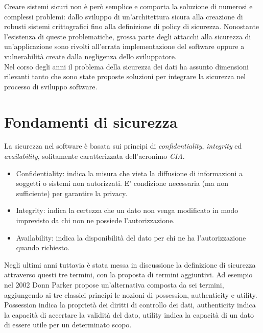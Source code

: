 Creare sistemi sicuri non è però semplice e comporta la soluzione di numerosi e complessi problemi: dallo sviluppo di un'architettura sicura alla creazione di robusti sistemi crittografici fino alla definizione di policy di sicurezza. Nonostante l'esistenza di queste problematiche, grossa parte degli attacchi alla sicurezza di un'applicazione sono rivolti all'errata implementazione del software oppure a vulnerabilità create dalla negligenza dello sviluppatore.\\
Nel corso degli anni il problema della sicurezza dei dati ha assunto dimensioni rilevanti tanto che sono state proposte soluzioni per integrare la sicurezza nel processo di sviluppo software.

\section{Fondamenti di sicurezza}
La sicurezza nel software è basata sui principi di \emph{confidentiality}, \emph{integrity} ed \emph{availability}, solitamente caratterizzata dell'acronimo \emph{CIA}.\\
\begin{itemize}
\item Confidentiality: indica la misura che vieta la diffusione di informazioni a soggetti o sistemi non autorizzati. E' condizione necessaria (ma non sufficiente) per garantire la privacy.
\item Integrity: indica la certezza che un dato non venga modificato in modo imprevisto da chi non ne possiede l'autorizzazione.
\item Availability: indica la disponibilità del dato per chi ne ha l'autorizzazione quando richiesto.
\end{itemize}
Negli ultimi anni tuttavia è stata messa in discussione la definizione di sicurezza attraverso questi tre termini, con la proposta di termini aggiuntivi. Ad esempio nel 2002 Donn Parker\cite{CITAZIONE} propose un'alternativa composta da sei termini, aggiungendo ai tre classici principi le nozioni di possession, authenticity e utility.
Possession indica la proprietà dei diritti di controllo dei dati, authenticity indica la capacità di accertare la validità del dato, utility indica la capacità di un dato di essere utile per un determinato scopo.

